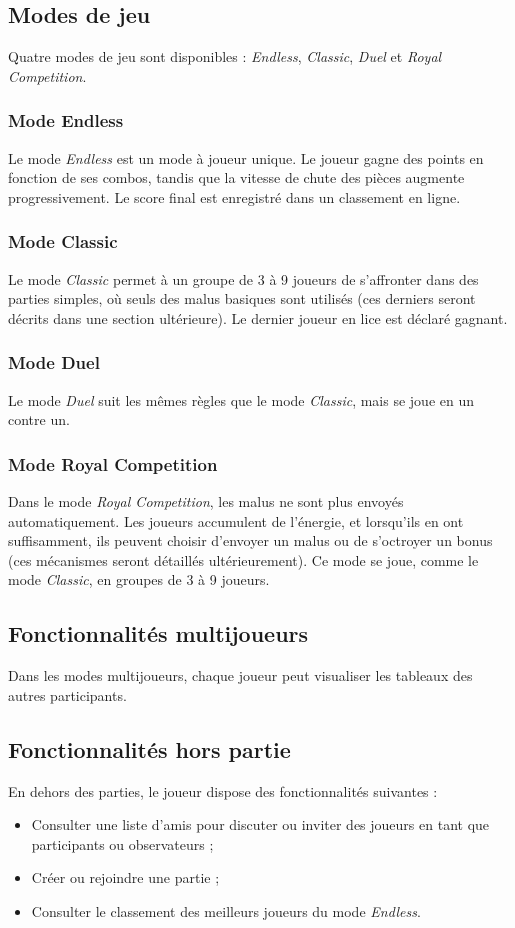 \documentclass{report}
\begin{document}
\subsection{Modes de jeu}
\noindent Quatre modes de jeu sont disponibles : \emph{Endless}, \emph{Classic}, \emph{Duel} et \emph{Royal Competition}.

\subsubsection{Mode Endless}
\noindent Le mode \emph{Endless} est un mode à joueur unique. Le joueur gagne des points en fonction de ses combos, tandis que la vitesse de chute des pièces augmente progressivement. Le score final est enregistré dans un classement en ligne.

\subsubsection{Mode Classic}
\noindent Le mode \emph{Classic} permet à un groupe de 3 à 9 joueurs de s’affronter dans des parties simples, où seuls des malus basiques sont utilisés (ces derniers seront décrits dans une section ultérieure). Le dernier joueur en lice est déclaré gagnant.

\subsubsection{Mode Duel}
\noindent Le mode \emph{Duel} suit les mêmes règles que le mode \emph{Classic}, mais se joue en un contre un.

\subsubsection{Mode Royal Competition}
\noindent Dans le mode \emph{Royal Competition}, les malus ne sont plus envoyés automatiquement. Les joueurs accumulent de l'énergie, et lorsqu’ils en ont suffisamment, ils peuvent choisir d'envoyer un malus ou de s’octroyer un bonus (ces mécanismes seront détaillés ultérieurement). Ce mode se joue, comme le mode \emph{Classic}, en groupes de 3 à 9 joueurs.

\subsection{Fonctionnalités multijoueurs}
\noindent Dans les modes multijoueurs, chaque joueur peut visualiser les tableaux des autres participants.

\subsection{Fonctionnalités hors partie}
\noindent En dehors des parties, le joueur dispose des fonctionnalités suivantes :
\begin{itemize}
    \item Consulter une liste d'amis pour discuter ou inviter des joueurs en tant que participants ou observateurs ;
    \item Créer ou rejoindre une partie ;
    \item Consulter le classement des meilleurs joueurs du mode \emph{Endless}.
\end{itemize}
\end{document}
